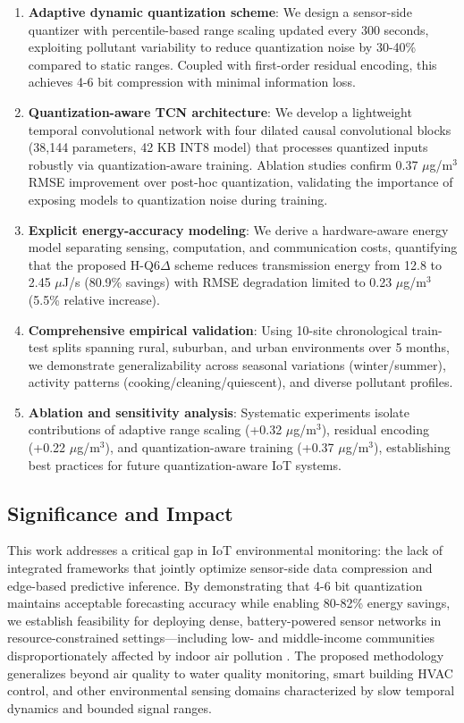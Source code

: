 \begin{enumerate}
\item \textbf{Adaptive dynamic quantization scheme}: We design a sensor-side quantizer with percentile-based range scaling updated every 300 seconds, exploiting pollutant variability to reduce quantization noise by 30-40\% compared to static ranges. Coupled with first-order residual encoding, this achieves 4-6 bit compression with minimal information loss.

\item \textbf{Quantization-aware TCN architecture}: We develop a lightweight temporal convolutional network with four dilated causal convolutional blocks (38,144 parameters, 42 KB INT8 model) that processes quantized inputs robustly via quantization-aware training. Ablation studies confirm 0.37 $\mu$g/m$^3$ RMSE improvement over post-hoc quantization, validating the importance of exposing models to quantization noise during training.

\item \textbf{Explicit energy-accuracy modeling}: We derive a hardware-aware energy model separating sensing, computation, and communication costs, quantifying that the proposed H-Q6$\Delta$ scheme reduces transmission energy from 12.8 to 2.45 $\mu$J/s (80.9\% savings) with RMSE degradation limited to 0.23 $\mu$g/m$^3$ (5.5\% relative increase).

\item \textbf{Comprehensive empirical validation}: Using 10-site chronological train-test splits spanning rural, suburban, and urban environments over 5 months, we demonstrate generalizability across seasonal variations (winter/summer), activity patterns (cooking/cleaning/quiescent), and diverse pollutant profiles.

\item \textbf{Ablation and sensitivity analysis}: Systematic experiments isolate contributions of adaptive range scaling (+0.32 $\mu$g/m$^3$), residual encoding (+0.22 $\mu$g/m$^3$), and quantization-aware training (+0.37 $\mu$g/m$^3$), establishing best practices for future quantization-aware IoT systems.
\end{enumerate}

\subsection{Significance and Impact}

This work addresses a critical gap in IoT environmental monitoring: the lack of integrated frameworks that jointly optimize sensor-side data compression and edge-based predictive inference. By demonstrating that 4-6 bit quantization maintains acceptable forecasting accuracy while enabling 80-82\% energy savings, we establish feasibility for deploying dense, battery-powered sensor networks in resource-constrained settings—including low- and middle-income communities disproportionately affected by indoor air pollution \cite{karmakar2024exploring}. The proposed methodology generalizes beyond air quality to water quality monitoring, smart building HVAC control, and other environmental sensing domains characterized by slow temporal dynamics and bounded signal ranges.

